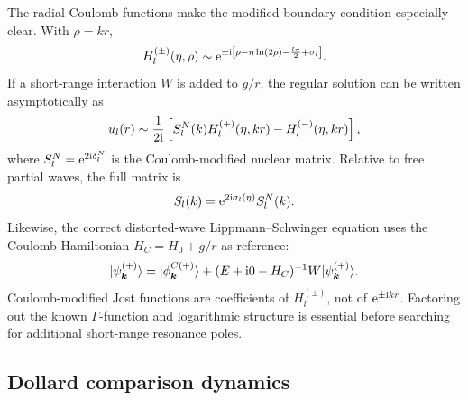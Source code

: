 The radial Coulomb functions make the modified boundary condition especially
clear.  With $\rho=kr$,
\begin{equation}
  H_l^{(\pm)}(\eta,\rho)
  \sim
  \mathrm{e}^{
  \pm\mathrm{i}\left[
  \rho-\eta\ln(2\rho)-\frac{l\pi}{2}+\sigma_l
  \right]}.
  \label{eq:coulomb-H-asymptotic}
\end{equation}
If a short-range interaction $W$ is added to $g/r$, the regular solution can
be written asymptotically as
\begin{equation}
  u_l(r)\sim\frac{1}{2\mathrm{i}}
  \left[
  S_l^{N}(k)H_l^{(+)}(\eta,kr)
  -H_l^{(-)}(\eta,kr)
  \right],
  \label{eq:coulomb-modified-radial-S}
\end{equation}
where $S_l^{N}=\mathrm{e}^{2\mathrm{i}\delta_l^N}$ is the Coulomb-modified nuclear
matrix.  Relative to free partial waves, the full matrix is
\begin{equation}
  S_l(k)=\mathrm{e}^{2\mathrm{i}\sigma_l(\eta)}S_l^{N}(k).
  \label{eq:full-coulomb-nuclear-S}
\end{equation}
Likewise, the correct distorted-wave Lippmann--Schwinger equation uses the
Coulomb Hamiltonian $H_C=H_0+g/r$ as reference:
\begin{equation}
  \lvert \psi_{\bm k}^{(+)} \rangle
  =\lvert \phi_{\bm k}^{C(+)} \rangle
  +(E+\mathrm{i}0-H_C)^{-1}W\lvert \psi_{\bm k}^{(+)} \rangle .
  \label{eq:coulomb-distorted-LS}
\end{equation}
Coulomb-modified Jost functions are coefficients of
$H_l^{(\pm)}$, not of $\mathrm{e}^{\pm\mathrm{i} kr}$.  Factoring out the known
$\Gamma$-function and logarithmic structure is essential before searching for
additional short-range resonance poles.

\subsection{Dollard comparison dynamics}
\label{subsec:dollard}

